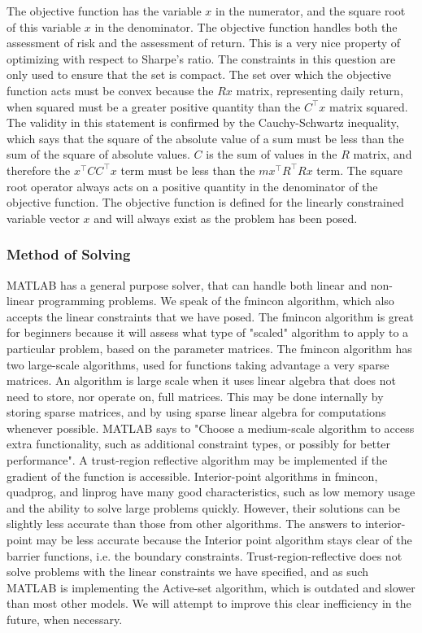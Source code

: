 	The objective function has the variable $x$ in the numerator, and the square root of this variable $x$ in the denominator.  The objective function handles both the assessment of risk and the assessment of return.  This is a very nice property of optimizing with respect to Sharpe's ratio.  The constraints in this question are only used to ensure that the set is compact.  The set over which the objective function acts must be convex because the $Rx$ matrix, representing daily return, when squared must be a greater positive quantity than the ${C}^\top x$ matrix squared.  The validity in this statement is confirmed by the Cauchy-Schwartz inequality, which says that the square of the absolute value of a sum must be less than the sum of the square of absolute values.  $C$ is the sum of values in the $R$ matrix, and therefore the  ${x}^\top{C}{C}^\top{x}$ term must be less than the $m {x}^\top{R}^\top{R}{x}$ term.  The square root operator always acts on a positive quantity in the denominator of the objective function.  The objective function is defined for the linearly constrained variable vector $x$ and will always exist as the problem has been posed.  


\subsubsection{Method of Solving}\cite{back8}

MATLAB has a general purpose solver, that can handle both linear and non-linear programming problems.  We speak of the fmincon algorithm, which also accepts the linear constraints that we have posed.  The fmincon algorithm is great for beginners because it will assess what type of "scaled" algorithm to apply to a particular problem, based on the parameter matrices.  The fmincon algorithm has two large-scale algorithms, used for functions taking advantage a very sparse matrices.  An algorithm is large scale when it uses linear algebra that does not need to store, nor operate on, full matrices. This may be done internally by storing sparse matrices, and by using sparse linear algebra for computations whenever possible. MATLAB says to "Choose a medium-scale algorithm to access extra functionality, such as additional constraint types, or possibly for better performance".  A trust-region reflective algorithm may be implemented if the gradient of the function is accessible.  Interior-point algorithms in fmincon, quadprog, and linprog have many good characteristics, such as low memory usage and the ability to solve large problems quickly. However, their solutions can be slightly less accurate than those from other algorithms.  The answers to interior-point may be less accurate because the Interior point algorithm stays clear of the barrier functions, i.e. the boundary constraints.  Trust-region-reflective does not solve problems with the linear constraints we have specified, and as such MATLAB is implementing the Active-set algorithm, which is outdated and slower than most other models.  We will attempt to improve this clear inefficiency in the future, when necessary.
